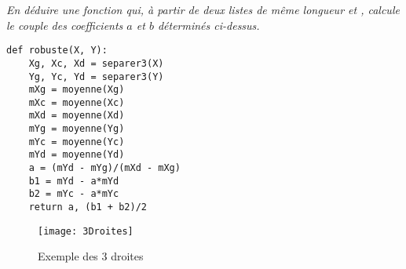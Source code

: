 \begin{Exercise}\it En déduire une fonction  qui, à partir de deux listes de même longueur  et , calcule le couple  des coefficients $a$ et $b$ déterminés ci-dessus.
\end{Exercise} 
\begin{Answer} 
\begin{lstlisting}
def robuste(X, Y):
    Xg, Xc, Xd = separer3(X)
    Yg, Yc, Yd = separer3(Y)
    mXg = moyenne(Xg)
    mXc = moyenne(Xc)
    mXd = moyenne(Xd)
    mYg = moyenne(Yg)
    mYc = moyenne(Yc)
    mYd = moyenne(Yd)
    a = (mYd - mYg)/(mXd - mXg)
    b1 = mYd - a*mYd
    b2 = mYc - a*mYc
    return a, (b1 + b2)/2
\end{lstlisting}
\end{Answer}
\begin{figure}[ht]
\begin{center}
\texttt{[image: 3Droites]}
\caption{Exemple des 3 droites}
\end{center}
\end{figure}






